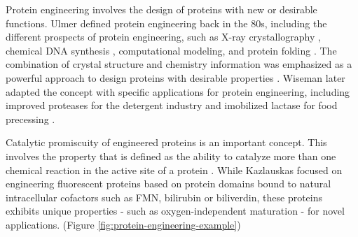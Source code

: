 \begin{refsection}
Protein engineering involves the design of proteins with new or desirable
functions. Ulmer  defined protein engineering back
in the 80s, including the different prospects of protein engineering, such as
X-ray crystallography \cite{Takeda2006}, chemical DNA
synthesis \cite{Pannekoek1979}, computational modeling, and protein
folding \cite{Ulmer1983}. The combination of crystal structure and chemistry
information was emphasized as a powerful approach to design proteins with
desirable properties \cite{Ulmer1983}. Wiseman  later adapted the
concept with specific applications for protein engineering, including improved
proteases for the detergent industry \cite{Wiseman1993,Harwood1992} and
imobilized lactase for food precessing \cite{Wiseman1993}. 

Catalytic promiscuity of engineered proteins is an important concept. This
involves the property that is defined as the ability to catalyze more than one
chemical reaction in the active site of a protein \cite{Kazlauskas2005}. While
Kazlauskas  focused on engineering fluorescent proteins based on protein
domains bound to natural intracellular cofactors  such as FMN, bilirubin or
biliverdin, these proteins exhibits unique properties - such as
oxygen-independent maturation - for novel applications. (Figure
\ref{fig:protein-engineering-example})


\end{refsection}
